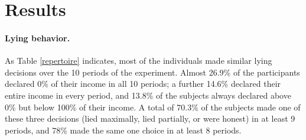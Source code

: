 \documentclass[12pt]{article}
\begin{document}
\section*{Results}





\paragraph{Lying behavior.} As Table \ref{repertoire} indicates, most of the individuals made similar lying decisions over the 10 periods of the experiment. Almost 26.9\% of the participants declared 0\% of their income in all 10 periods; a further 14.6\% declared their entire income in every period, and 13.8\% of the subjects always declared above 0\% but below 100\% of their income. A total of 70.3\% of the subjects made one of these three decisions (lied maximally, lied partially, or were honest) in at least 9 periods, and 78\% made the same one choice in at least 8 periods. 

\end{document}
